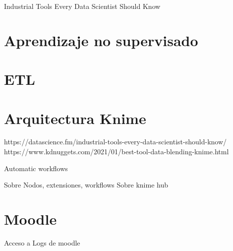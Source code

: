 

Industrial Tools Every Data Scientist Should Know



\section{Aprendizaje no supervisado}


\section{ETL}



\section{Arquitectura Knime}

https://datascience.fm/industrial-tools-every-data-scientist-should-know/
https://www.kdnuggets.com/2021/01/best-tool-data-blending-knime.html

Automatic workflows


Sobre Nodos, extensiones, workflows
Sobre knime hub



\section{Moodle}

Acceso a Logs de moodle



